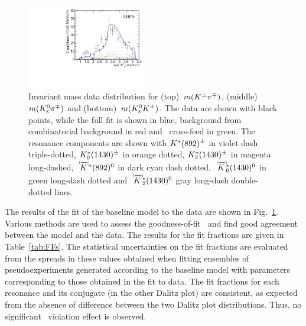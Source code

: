 \begin{figure}[!tb]
\begin{center}
    \includegraphics*[width=0.47\textwidth]{figs/m23_Bs2KSpiK_Combined.pdf}
  \end{center}
\caption{\small
  Invariant mass data distribution for (top)~$m({{K}^\pm}{{\pi}^\mp})$, (middle)~$m({{K}^0_{\mathrm{ \scriptscriptstyle S}}}{{\pi}^\mp})$ and (bottom)~$m({{K}^0_{\mathrm{ \scriptscriptstyle S}}}{{K}^\pm})$. 
  The data are shown with black points, while the full fit is shown in blue, background from combinatorial background in red and \BdToKSpipi\ cross-feed in green.
  The resonance components are shown with
  ${{K}^*}(892)^{\pm}$ in violet dash triple-dotted, ${K}^*_0(1430)^{\pm}$ in orange dotted, ${K}^*_2(1430)^{\pm}$ in magenta long-dashed, 
  $\KstarIzoptbar$ in dark cyan dash dotted, $\KstarIIzoptbar$ in green long-dash dotted and $\KstarIIIzoptbar$ gray long-dash double-dotted lines. 
  }
  \label{fig:dp-fits}
\end{figure}

The results of the fit of the baseline model to the data are shown in Fig.~\ref{fig:dp-fits}.
Various methods are used to assess the goodness-of-fit~\cite{Williams:2010vh} and find good agreement between the model and the data.
The results for the fit fractions are given in Table~\ref{tab:FFs}.
The statistical uncertainties on the fit fractions are evaluated from the spreads in these values obtained when fitting ensembles of pseudoexperiments generated according to the baseline model with parameters corresponding to those obtained in the fit to data.
The fit fractions for each resonance and its conjugate (in the other Dalitz plot) are consistent, as expected from the absence of difference between the two Dalitz plot distributions.
Thus, no significant \CP\ violation effect is observed.

